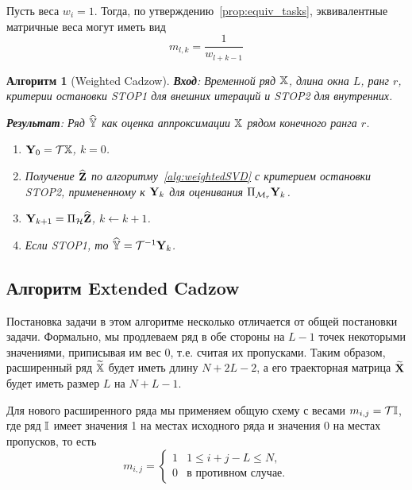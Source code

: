 \documentclass[12pt,a4paper,fleqn,leqno]{article}
\newtheorem{algorithm}{Алгоритм}%
\begin{document}
Пусть веса $w_{i}=1$. Тогда, по утверждению~\ref{prop:equiv_tasks}, эквивалентные матричные веса могут иметь вид 
\begin{equation} 
\label{Mw}
   m_{l, k} = \frac{1}{w_{l + k - 1}}
\end{equation}

\begin{algorithm}[Weighted Cadzow]
\textbf{Вход}: Временной ряд $\mathbb{X}$, длина окна $L$, ранг $r$,
критерии остановки STOP1 для внешних итераций и STOP2 для внутренних.

\textbf{Результат}:
Ряд $\widehat{\mathbb{Y}}$ как оценка аппроксимации $\mathbb{X}$ рядом конечного ранга $r$.

\begin{enumerate}
\item
$\mathbf{Y}_0 = \mathcal{T} \mathbb{X}$, $k=0$.
\item
Получение $\widehat{\mathbf{Z}}$ по алгоритму~\ref{alg:weightedSVD} с критерием остановки STOP2, примененному к $\mathbf{Y}_k$ для оценивания $\Pi_{\mathcal{M}_r} \mathbf{Y}_{k}$.
\item
$\mathbf{Y}_{k+1} = \Pi_{\mathcal{H}}  \widehat{\mathbf{Z}}$, $k\leftarrow k+1$.
\item
Если STOP1, то $\widehat{\mathbb{Y}} = \mathcal{T}^{-1} \mathbf{Y}_k$.
\end{enumerate}
\end{algorithm}

\subsection{Алгоритм Extended Cadzow}

Постановка задачи в этом алгоритме несколько отличается от общей постановки задачи.
Формально, мы продлеваем ряд в обе стороны на $L-1$ точек некоторыми значениями, приписывая им вес 0, т.е.
считая их пропусками. Таким образом, расширенный ряд $\widetilde{\mathbb{X}}$ будет иметь длину $N+2L-2$, а его траекторная матрица
$\widetilde{\mathbf{X}}$ будет иметь размер $L$ на $N+L-1$.

Для нового расширенного ряда мы применяем общую схему с весами $m_{i,j}=\mathcal{T} \mathbb{I}$, где ряд $\mathbb{I}$ имеет 
значения 1 на местах исходного ряда и значения 0 на местах пропусков, то есть
\begin{equation*}
m_{i,j} = \begin{cases}
1 & 1 \le i+j-L \le N, \\
0 & \text{в противном случае.}
\end{cases}
\end{equation*}
\end{document}

